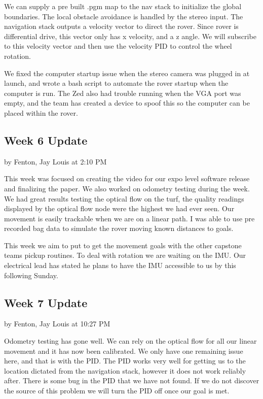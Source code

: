 \documentclass[10pt, oneside,onecolumn]{IEEEtran}
\begin{document}
We can supply a pre built .pgm map to the nav stack to initialize the global boundaries. The local obstacle avoidance is handled by the stereo input. The navigation stack outputs a velocity vector to direct the rover. Since rover is differential drive, this vector only has x velocity, and a z angle. We will subscribe to this velocity vector and then use the velocity PID to control the wheel rotation. 

We fixed the computer startup issue when the stereo camera was plugged in at launch, and wrote a bash script to automate the rover startup when the computer is run. The Zed also had trouble running when the VGA port was empty, and the team has created a device to spoof this so the computer can be placed within the rover. 

\subsection{Week 6 Update}
by Fenton, Jay Louis at 2:10 PM

This week was focused on creating the video for our expo level software release and finalizing the paper. We also worked on odometry testing during the week. We had great results testing the optical flow on the turf, the quality readings displayed by the optical flow node were the highest we had ever seen. Our movement is easily trackable when we are on a linear path. I was able to use pre recorded bag data to simulate the rover moving known distances to goals.

This week we aim to put to get the movement goals with the other capstone teams pickup routines. To deal with rotation we are waiting on the IMU. Our electrical lead has stated he plans to have the IMU accessible to us by this following Sunday. 

\subsection{Week 7 Update}
by Fenton, Jay Louis at 10:27 PM

Odometry testing has gone well. We can rely on the optical flow for all our linear movement and it has now been calibrated. We only have one remaining issue here, and that is with the PID. The PID works very well for getting us to the location dictated from the navigation stack, however it does not work reliably after. There is some bug in the PID that we have not found. If we do not discover the source of this problem we will turn the PID off once our goal is met. 
\end{document}

